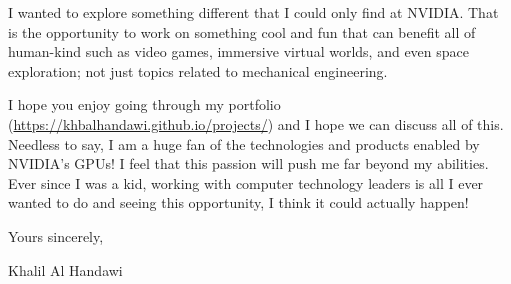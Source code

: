 \documentclass[12pt]{article} %
\begin{document}
\medskip %

I wanted to explore something different that I could only find at NVIDIA. That is the opportunity to work on something cool and fun that can benefit all of human-kind such as video games, immersive virtual worlds, and even space exploration; not just topics related to mechanical engineering. 

\medskip %

I hope you enjoy going through my portfolio (\href{https://khbalhandawi.github.io/projects/}{https://khbalhandawi.github.io/projects/}) and I hope we can discuss all of this. Needless to say, I am a huge fan of the technologies and products enabled by NVIDIA's GPUs! I feel that this passion will push me far beyond my abilities. Ever since I was a kid, working with computer technology leaders is all I ever wanted to do and seeing this opportunity, I think it could actually happen!





\medskip %

Yours sincerely,

\medskip %

Khalil Al Handawi

\medskip %

\end{document}
